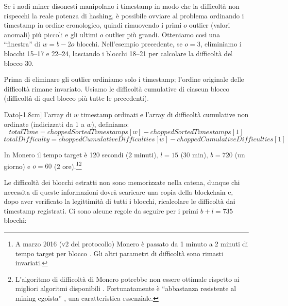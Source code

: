 Se i nodi miner disonesti manipolano i timestamp in modo che la difficoltà non rispecchi la reale potenza di hashing, è possibile ovviare al problema ordinando i timestamp in ordine cronologico, quindi rimuovendo i primi $o$ outlier (valori anomali) più piccoli e gli ultimi $o$ outlier più grandi. Otteniamo così una “finestra” di $w = b - 2o$ blocchi. Nell’esempio precedente, se $o=3$, eliminiamo i blocchi 15–17 e 22–24, lasciando i blocchi 18–21 per calcolare la difficoltà del blocco 30.

Prima di eliminare gli outlier ordiniamo solo i timestamp; l'ordine originale delle difficoltà rimane invariato. Usiamo le difficoltà cumulative di ciascun blocco (difficoltà di quel blocco più tutte le precedenti).

Dato[-1.8cm] l’array di $w$ timestamp ordinati e l’array di difficoltà cumulative non ordinate (indicizzati da $1$ a $w$), definiamo:
\[ \mathit{totalTime} = \mathit{choppedSortedTimestamps}[w] - \mathit{choppedSortedTimestamps}[1]\]
\[ \mathit{totalDifficulty} = \mathit{choppedCumulativeDifficulties}[w] - \mathit{choppedCumulativeDifficulties}[1]\]

In Monero il tempo target è 120 secondi (2 minuti), $l=15$ (30 min), $b=720$ (un giorno) e $o=60$ (2 ore).\footnote{A marzo 2016 (v2 del protocollo) Monero è passato da 1 minuto a 2 minuti di tempo target per blocco \cite{monero-0.9.3}. Gli altri parametri di difficoltà sono rimasti invariati.}\footnote{L’algoritmo di difficoltà di Monero potrebbe non essere ottimale rispetto ai migliori algoritmi disponibili \cite{difficuly-algorithm-summary}. Fortunatamente è “abbastanza resistente al mining egoista” \cite{selfish-miner-profitability-algorithm-analysis}, una caratteristica essenziale.}

Le difficoltà dei blocchi estratti non sono memorizzate nella catena, dunque chi necessita di queste informazioni dovrà scaricare una copia della blockchain e, dopo aver verificato la legittimità di tutti i blocchi, ricalcolare le difficoltà dai timestamp registrati. Ci sono alcune regole da seguire per i primi $b + l = 735$ blocchi:

